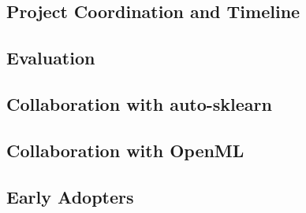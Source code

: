 \subsection{Project Coordination and Timeline}
\subsection{Evaluation}

\subsection{Collaboration with auto-sklearn}
\subsection{Collaboration with OpenML}
\subsection{Early Adopters}




